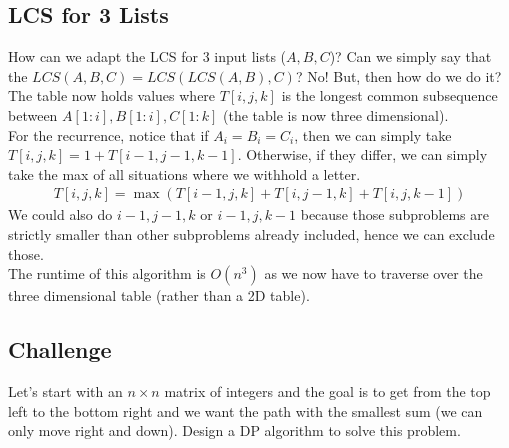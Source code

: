 \documentclass[14pt]{extarticle}
\begin{document}
    \subsection*{LCS for 3 Lists}
    How can we adapt the LCS for 3 input lists ($A, B, C$)? Can we simply
    say that the $LCS(A, B, C) = LCS(LCS(A, B), C)$? No! But, then how do we
    do it?\\

    The table now holds values where $T[i, j, k]$ is the longest common
    subsequence between $A[1:i], B[1:i], C[1:k]$ (the table is now three
    dimensional).\\

    For the recurrence, notice that if $A_i = B_i = C_i$, then we can simply
    take $T[i, j, k] = 1 + T[i-1, j-1, k-1]$. Otherwise, if they differ, we can
    simply take the max of all situations where we withhold a letter.
    \begin{align*}
        T[i, j, k] = \max\left(T[i-1,j,k] + T[i,j-1,k] + T[i,j,k-1]\right)
    \end{align*}
    We could also do $i-1,j-1,k$ or $i-1,j,k-1$ because those subproblems are
    strictly smaller than other subproblems already included, hence we can
    exclude those.\\

    The runtime of this algorithm is $O(n^3)$ as we now have to traverse over
    the three dimensional table (rather than a 2D table).

    \subsection*{Challenge}
    Let's start with an $n\times n$ matrix of integers and the goal is to get
    from the top left to the bottom right and we want the path with the
    smallest sum (we can only move right and down). Design a DP algorithm
    to solve this problem.
\end{document}
